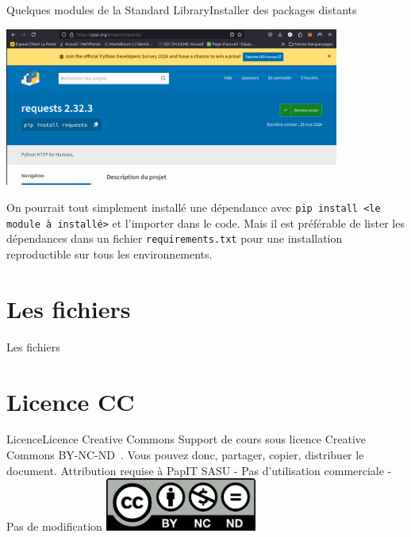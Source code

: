 \documentclass{beamer}
\begin{document}
    \begin{frame}{Quelques modules de la Standard Library}{Installer des packages distants}
        \begin{center}
            \includegraphics[width=11cm]{image/pypi-requests-page}
        \end{center}
        \begin{dangercolorbox}
            On pourrait tout simplement installé une dépendance avec \lstinline{pip install <le module à installé>} et l'importer dans le code.
            Mais il est préférable de lister les dépendances dans un fichier \lstinline{requirements.txt} pour une installation reproductible sur tous les environnements.
        \end{dangercolorbox}
    \end{frame}


    \section{Les fichiers}\label{sec:files}

    \begin{frame}{Les fichiers}
    \end{frame}


    \section{Licence CC}\label{sec:licence}

    \begin{frame}{Licence}{Licence Creative Commons}
        Support de cours sous licence Creative Commons BY-NC-ND~.
        \bigbreak
        Vous pouvez donc, partager, copier, distribuer le document.
        \bigbreak
        Attribution requise à PapIT SASU - Pas d’utilisation commerciale - Pas de modification
        \bigbreak
        \centering
        \includegraphics[width=5cm]{image/by-nc-nd-logo}
    \end{frame}
\end{document}
